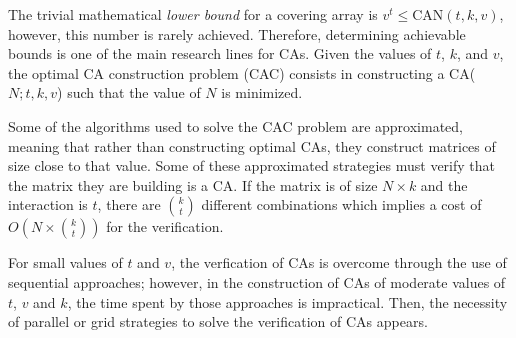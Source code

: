 The trivial mathematical \textit{lower bound} for a covering array is $v^{t} \leq \text{CAN}(t, k ,v)$, however, this number is rarely achieved. Therefore, determining achievable bounds is one of the main research lines for CAs. Given the values of $t$, $k$, and $v$, the optimal CA construction problem (CAC) consists in constructing a CA($N; t, k, v$) such that the value of $N$ is minimized.

Some of the algorithms used to solve the CAC problem are approximated, meaning that rather than constructing optimal CAs, they construct matrices of size close to that value. Some of these approximated strategies must verify that the matrix they are building is a CA. If the matrix is of size $N \times k$ and the interaction is $t$, there are $\binom{k}{t}$ different combinations which implies a cost of $O(N \times \binom{k}{t})$ for the verification.

For small values of $t$ and $v$, the verfication of CAs is overcome through the use of sequential approaches; however, in the construction of CAs of moderate values of $t$, $v$ and $k$, the time spent by those approaches is impractical. Then, the necessity of parallel or grid strategies to solve the verification of CAs appears.
